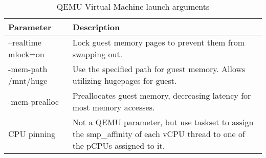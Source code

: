 \begin{table}
    \centering
    \caption{QEMU Virtual Machine launch arguments}
    \label{tab:qemu_params_table}
\begin{tabular}{|l|p{10cm}|}
\hline
Parameter & Description \\
\hline \hline
--realtime mlock=on & Lock guest memory pages to prevent them from swapping out.\\ 
\hline
-mem-path /mnt/huge & Use the specified path for guest memory.  Allows utilizing hugepages for guest.\\
\hline
-mem-prealloc & Preallocates guest memory, decreasing latency for most memory accesses.\\
\hline
CPU pinning & Not a QEMU parameter, but use taskset to assign the smp\_affinity of each vCPU thread to one of the pCPUs assigned to it.\\
\hline
\end{tabular}
\end{table}

